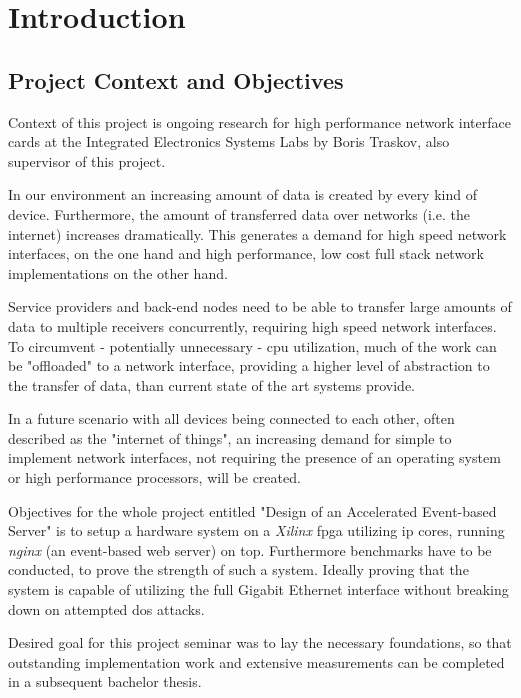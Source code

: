 \chapter{Introduction}

\section{Project Context and Objectives}

Context of this project is ongoing research for high performance network interface cards at the Integrated Electronics Systems Labs by Boris Traskov, also supervisor of this project.

In our environment an increasing amount of data is created by every kind of device. Furthermore, the amount of transferred data over networks (i.e. the internet) increases dramatically. This generates a demand for high speed network interfaces, on the one hand and high performance, low cost full stack network implementations on the other hand. 

Service providers and back-end nodes need to be able to transfer large amounts of data to multiple receivers concurrently, requiring high speed network interfaces. To circumvent - potentially unnecessary - \gls{cpu} utilization, much of the work can be "offloaded" to a network interface, providing a higher level of abstraction to the transfer of data, than current state of the art systems provide.

In a future scenario with all devices being connected to each other, often described as the "internet of things", an increasing demand for simple to implement network interfaces, not requiring the presence of an operating system or high performance processors, will be created.


Objectives for the whole project entitled "Design of an Accelerated Event-based Server" is to setup a hardware system on a \textit{Xilinx} \gls{fpga} utilizing \gls{ip} cores, running \textit{nginx} (an event-based web server) on top. Furthermore benchmarks have to be conducted, to prove the strength of such a system. Ideally proving that the system is capable of utilizing the full Gigabit Ethernet interface without breaking down on attempted \gls{dos} attacks.

Desired goal for this project seminar was to lay the necessary foundations, so that outstanding implementation work and extensive measurements can be completed in a subsequent bachelor thesis.

